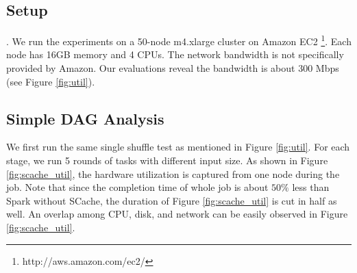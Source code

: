 \subsection{Setup}\label{stepup}
\ifrevision
{}
\fi
{} \cite{sparkconf}. 
We run the experiments on a 50-node m4.xlarge cluster on Amazon EC2 \footnote{http://aws.amazon.com/ec2/}. 
Each node has 16GB memory and 4 CPUs. The network bandwidth is not specifically provided by Amazon. 
Our evaluations reveal the bandwidth is about 300 Mbps (see Figure \ref{fig:util}).

\subsection{Simple DAG Analysis}\label{simpledag}
We first run the same single shuffle test as mentioned in Figure \ref{fig:util}. 
For each stage, we run 5 rounds of tasks with different input size. 
As shown in Figure \ref{fig:scache_util}, the hardware utilization is captured from one node during the job. 
Note that since the completion time of whole job is about $50\%$ less than Spark without SCache, the duration of Figure \ref{fig:scache_util} is cut in half as well. 
\ifrevision
{}
\fi
An overlap among CPU, disk, and network can be easily observed in Figure \ref{fig:scache_util}. 

